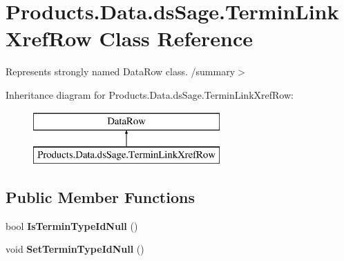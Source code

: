 \hypertarget{class_products_1_1_data_1_1ds_sage_1_1_termin_link_xref_row}{}\section{Products.\+Data.\+ds\+Sage.\+Termin\+Link\+Xref\+Row Class Reference}
\label{class_products_1_1_data_1_1ds_sage_1_1_termin_link_xref_row}


Represents strongly named Data\+Row class. /summary$>$  


Inheritance diagram for Products.\+Data.\+ds\+Sage.\+Termin\+Link\+Xref\+Row\+:\begin{figure}[H]
\begin{center}
\leavevmode
\includegraphics[height=2.000000cm]{class_products_1_1_data_1_1ds_sage_1_1_termin_link_xref_row}
\end{center}
\end{figure}
\subsection*{Public Member Functions}
\begin{DoxyCompactItemize}
\item 
bool {\bfseries Is\+Termin\+Type\+Id\+Null} ()\hypertarget{class_products_1_1_data_1_1ds_sage_1_1_termin_link_xref_row_a2071cea91839321ca2fda851dc1f5981}{}\label{class_products_1_1_data_1_1ds_sage_1_1_termin_link_xref_row_a2071cea91839321ca2fda851dc1f5981}

\item 
void {\bfseries Set\+Termin\+Type\+Id\+Null} ()\hypertarget{class_products_1_1_data_1_1ds_sage_1_1_termin_link_xref_row_a13e9bd3c7c2273b96dee8e7b8ab81667}{}\label{class_products_1_1_data_1_1ds_sage_1_1_termin_link_xref_row_a13e9bd3c7c2273b96dee8e7b8ab81667}

\end{DoxyCompactItemize}
